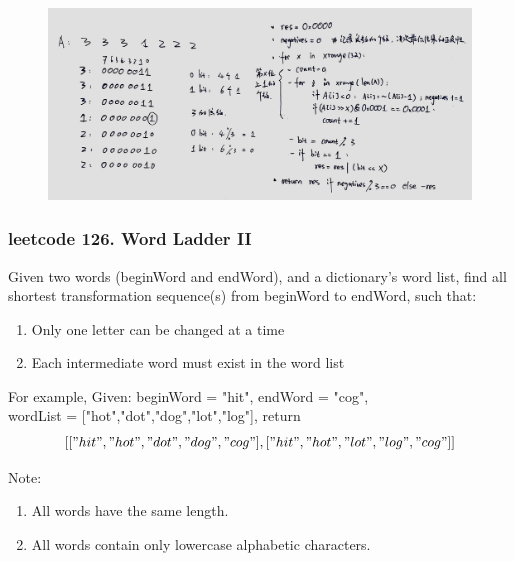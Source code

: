\documentclass[a4paper,10pt]{article}
\begin{document}
\begin{figure}[h]
    \includegraphics[width=\textwidth]{leetcode137.jpg}
    \centering \\
\end{figure}




\subsubsection{leetcode 126. Word Ladder II}
Given two words (beginWord and endWord), and a dictionary's word list, find all shortest transformation sequence(s) from beginWord to endWord, such that:
\begin{enumerate}
    \item Only one letter can be changed at a time
    \item Each intermediate word must exist in the word list
\end{enumerate}

\noindent For example, Given: beginWord = "hit", endWord = "cog", \\
wordList = ["hot","dot","dog","lot","log"], return
$$[["hit","hot","dot","dog","cog"],["hit","hot","lot","log","cog"]]$$ 
  
\noindent Note:
\begin{enumerate}
    \item All words have the same length.
    \item All words contain only lowercase alphabetic characters.
\end{enumerate}
\end{document}
